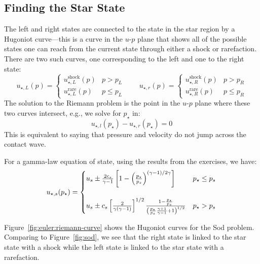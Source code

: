 \subsection{Finding the Star State}

The left and right states are connected to the state in the star
region by a Hugoniot curve---this is a curve in the $u$-$p$ plane that
shows all of the possible states one can reach from the current state
through either a shock or rarefaction.  There are two such curves, one
corresponding to the left and one to the right state:
\begin{equation}
u_{\star,L}(p) = \begin{cases}
   u_{\star,L}^\mathrm{shock}(p) & p > p_L \\
   u_{\star,L}^\mathrm{rare}(p) & p \le p_L 
   \end{cases}
\qquad
u_{\star,r}(p) = \begin{cases}
   u_{\star,R}^\mathrm{shock}(p) & p > p_R \\
   u_{\star,R}^\mathrm{rare}(p) & p \le p_R 
   \end{cases}
\end{equation}
The solution
to the Riemann problem is the point in the $u$-$p$ plane where these
two curves intersect, e.g., we solve for $p_\star$ in:
\begin{equation}
u_{\star,l}(p_\star) - u_{\star,r}(p_\star) = 0
\end{equation}
This is equivalent to saying that pressure and velocity do not jump
across the contact wave.

For a gamma-law equation of state, using the results from the
exercises, we have:
\begin{equation}
\renewcommand{\arraystretch}{1.5}
u_{\star,s}(p_\star) = \begin{cases}
  u_s \pm \frac{2c_s}{\gamma - 1} \left [ 1 - \left ( \frac{p_\star}{p_s}\right )^{(\gamma - 1)/2\gamma} \right ] & p_\star \le p_s \\
\\
%
  u_s \pm c_s \left [\frac{2}{\gamma(\gamma - 1)}\right]^{1/2} \frac{1 - \frac{p_\star}{p_s}}{\left ( \frac{p_\star}{p_s} \frac{\gamma + 1}{\gamma - 1} + 1\right)^{1/2}} & p_\star > p_s
\end{cases}
\renewcommand{\arraystretch}{1.0}
\end{equation}



Figure~\ref{fig:euler:riemann-curve} shows the Hugoniot curves for the
Sod problem.  Comparing to Figure~\ref{fig:sod}, we see that the right
state is linked to the star state with a shock while the left state is
linked to the star state with a rarefaction.

